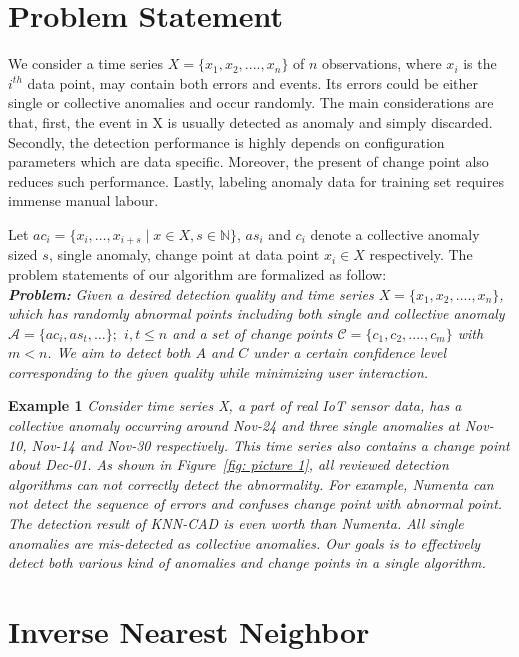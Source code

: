 \section{Problem Statement}
We consider a time series $ X = \{x_1, x_2, ...., x_n\}$ of $ n $ observations, where $ x_i $ is the $ i^{th} $ data point, may contain both errors and events. Its errors could be either single or collective anomalies and occur randomly. The main considerations are that, first, the event in X is usually detected as anomaly and simply discarded. Secondly, the detection performance is highly depends on configuration parameters which are data specific. Moreover, the present of change point also reduces such performance. Lastly, labeling anomaly data for training set requires immense manual labour. 
\par Let $ ac_i = \lbrace x_i, \ldots, x_{i+s} \mid x \in X, s \in \mathbb{N} \rbrace$, $as_i$ and $c_i$ denote a collective anomaly sized $ s $, single anomaly, change point at data point $x_i \in X$ respectively. The problem statements of our algorithm are formalized as follow:\\

\textbf{\textit{Problem:}} \textit{Given a desired detection quality and time series $ X = \{x_1, x_2, ...., x_n\}$, which has randomly abnormal points including both single and collective anomaly \\$ \mathcal{A} = \{ac_i, as_{t}, \ldots\}; $ $ i, t \leq n $ and a set of change points $ \mathcal{C} = \{ c_1, c_2, ...., c_m \} $ with $ m < n $. We aim to detect both $A$ and $C$ under a certain confidence level corresponding to the given quality while minimizing user interaction. 
}
\\
\par\textbf{Example 1} \textit{Consider time series X, a part of real IoT sensor data, has a collective anomaly occurring around Nov-24 and three single anomalies at Nov-10, Nov-14 and Nov-30 respectively. This time series also contains a change point about Dec-01. As shown in Figure~\ref{fig: picture 1}, all reviewed detection algorithms can not correctly detect the abnormality. For example, Numenta can not detect the sequence of errors and confuses change point with abnormal point. The detection result of KNN-CAD is even worth than Numenta. All single anomalies are mis-detected as collective anomalies. Our goals is to effectively detect both various kind of anomalies and change points in a single algorithm.}


\section{Inverse Nearest Neighbor}


